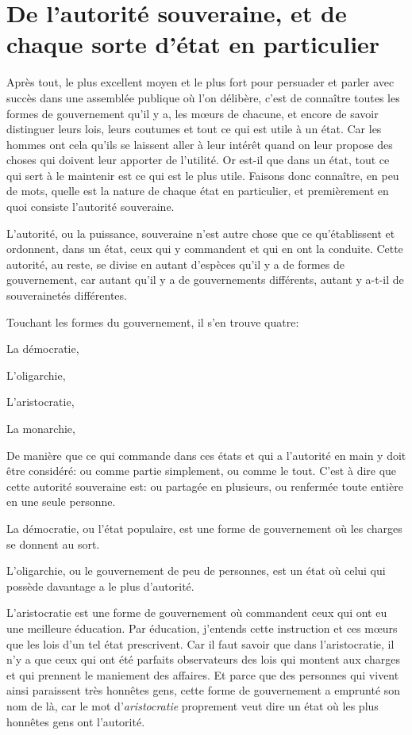 
\section{De l'autorité souveraine, et de chaque sorte d'état en particulier}


Après tout, le plus excellent moyen et le plus fort pour persuader et parler avec succès dans
une assemblée publique où l'on délibère, c'est de connaître toutes les formes de gouvernement
qu'il y a, les mœurs de chacune, et encore de savoir distinguer leurs lois, leurs coutumes et
tout ce qui est utile à un état. Car les hommes ont cela  qu'ils se laissent aller à leur intérêt
quand on leur propose des choses qui doivent leur apporter de l'utilité. Or est-il que dans un état,
tout ce qui sert à le maintenir est ce qui est le plus utile. Faisons donc connaître, en peu de mots,
quelle est la nature de chaque état en particulier, et premièrement en quoi consiste l'autorité
souveraine. 

\bigbreak

L'autorité, ou la puissance, souveraine n'est autre chose que ce qu’établissent et ordonnent, dans un
état, ceux qui y commandent et qui en ont la conduite. Cette autorité, au reste, se divise en autant
d'espèces qu'il y a de formes de gouvernement, car autant qu'il y a de gouvernements différents, autant
y a-t-il de souverainetés différentes.

\bigbreak

Touchant les formes du gouvernement, il s'en trouve quatre:

\begin{emphpar}
	La démocratie,

	L'oligarchie,

	L'aristocratie,

	La monarchie, 
\end{emphpar}

De manière que ce qui commande dans ces états et qui a l'autorité en main y doit être considéré: ou comme
partie simplement, ou comme le tout. C'est à dire que cette autorité souveraine est: ou partagée en
plusieurs, ou renfermée toute entière en une seule personne.

La démocratie, ou l'état populaire, est une forme de gouvernement où les charges se donnent au sort.

L'oligarchie, ou le gouvernement de peu de personnes, est un état où celui qui possède davantage a le plus
d'autorité.

L'aristocratie est une forme de gouvernement où commandent ceux qui ont eu une meilleure éducation. Par
éducation, j'entends cette instruction et ces mœurs que les lois d'un tel état prescrivent. Car il faut
savoir que dans l'aristocratie, il n'y a que ceux qui ont été parfaits observateurs des lois qui montent
aux charges et qui prennent le maniement des affaires. Et parce que des personnes qui vivent ainsi paraissent
très honnêtes gens, cette forme de gouvernement a emprunté son nom de là, car le mot d'\emph{aristocratie}
proprement veut dire un état où les plus honnêtes gens ont l'autorité.

